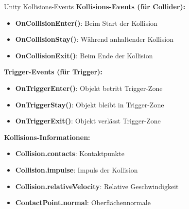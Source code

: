 \begin{definition}{Unity Kollisions-Events}
    \textbf{Kollisions-Events (für Collider):}
    \begin{itemize}
        \item \textbf{OnCollisionEnter()}: Beim Start der Kollision
        \item \textbf{OnCollisionStay()}: Während anhaltender Kollision
        \item \textbf{OnCollisionExit()}: Beim Ende der Kollision
    \end{itemize}
    
    \textbf{Trigger-Events (für Trigger):}
    \begin{itemize}
        \item \textbf{OnTriggerEnter()}: Objekt betritt Trigger-Zone
        \item \textbf{OnTriggerStay()}: Objekt bleibt in Trigger-Zone
        \item \textbf{OnTriggerExit()}: Objekt verlässt Trigger-Zone
    \end{itemize}
    
    \textbf{Kollisions-Informationen:}
    \begin{itemize}
        \item \textbf{Collision.contacts}: Kontaktpunkte
        \item \textbf{Collision.impulse}: Impuls der Kollision
        \item \textbf{Collision.relativeVelocity}: Relative Geschwindigkeit
        \item \textbf{ContactPoint.normal}: Oberflächennormale
    \end{itemize}
\end{definition}

